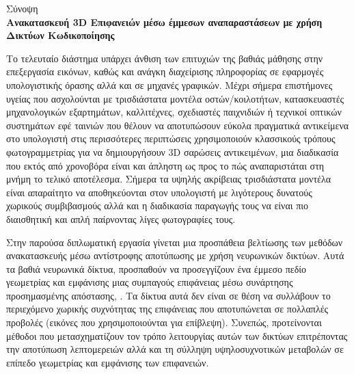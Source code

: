 \begin{center}
\centering
  Σύνοψη \\  
  \vspace{1cm}
  \textbf{Ανακατασκευή 3D Επιφανειών μέσω έμμεσων αναπαραστάσεων με χρήση Δικτύων Κωδικοποίησης}
\end{center}
    \par 
    Το τελευταίο διάστημα υπάρχει άνθιση των επιτυχιών της βαθιάς μάθησης στην επεξεργασία εικόνων, καθώς και ανάγκη διαχείρισης  πληροφορίας σε εφαρμογές υπολογιστικής όρασης αλλά και σε μηχανές γραφικών. Μέχρι σήμερα επιστήμονες υγείας που ασχολούνται με τρισδιάστατα μοντέλα οστών/κοιλοτήτων, κατασκευαστές μηχανολογικών εξαρτημάτων, καλλιτέχνες, σχεδιαστές παιχνιδιών ή τεχνικοί οπτικών συστημάτων εφέ ταινιών που θέλουν να αποτυπώσουν εύκολα πραγματικά αντικείμενα στο υπολογιστή στις περισσότερες περιπτώσεις χρησιμοποιούν κλασσικούς τρόπους φωτογραμμετρίας για να δημιουργήσουν 3D σαρώσεις  αντικειμένων, μια διαδικασία που εκτός από χρονοβόρα είναι και άπληστη ως προς το πώς αναπαριστάται στη μνήμη το τελικό αποτέλεσμα. Σήμερα τα υψηλής ακρίβειας τρισδιάστατα μοντέλα είναι απαραίτητο να αποθηκεύονται στον υπολογιστή με λιγότερους δυνατούς χωρικούς συμβιβασμούς αλλά και η διαδικασία παραγωγής τους να είναι πιο διαισθητική και απλή παίρνοντας λίγες φωτογραφίες τους.
\par
    Στην παρούσα διπλωματική εργασία γίνεται μια προσπάθεια βελτίωσης των μεθόδων  ανακατασκευής μέσω αντίστροφης αποτύπωσης με χρήση νευρωνικών δικτύων. Αυτά τα βαθιά νευρωνικά δίκτυα, προσπαθούν να προσεγγίζουν ένα έμμεσο πεδίο γεωμετρίας και εμφάνισης μιας συμπαγούς επιφάνειας μέσω συνάρτησης προσημασμένης απόστασης, . Τα δίκτυα αυτά δεν είναι σε θέση να συλλάβουν το περιεχόμενο χωρικής συχνότητας της επιφάνειας που αποτυπώνεται σε πολλαπλές προβολές (εικόνες που χρησιμοποιούνται για επίβλεψη). Συνεπώς, προτείνονται μέθοδοι που μετασχηματίζουν τον τρόπο λειτουργίας αυτών των δικτύων επιτρέποντας την αποτύπωση λεπτομερειών αλλά και τη σύλληψη υψηλοσυχνοτικών μεταβολών σε επίπεδο γεωμετρίας και εμφάνισης των επιφανειών.
    
